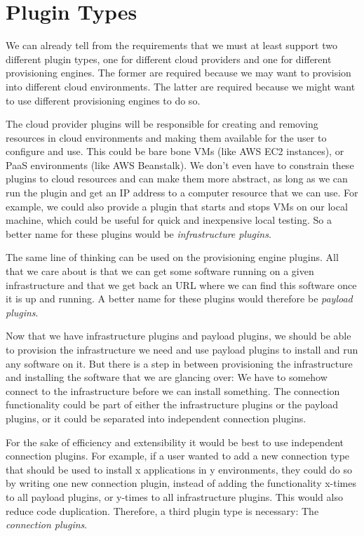 \section{Plugin Types}
\label{design:plugins}

We can already tell from the requirements that we must at least support two different plugin types, one for different cloud providers and one for different provisioning engines.
The former are required because we may want to provision into different cloud environments.
The latter are required because we might want to use different provisioning engines to do so.

The cloud provider plugins will be responsible for creating and removing resources in cloud environments and making them available for the user to configure and use.
This could be bare bone VMs (like AWS EC2 instances), or PaaS environments (like AWS Beanstalk).
We don't even have to constrain these plugins to cloud resources and can make them more abstract, as long as we can run the plugin and get an IP address to a computer resource that we can use.
For example, we could also provide a plugin that starts and stops VMs on our local machine, which could be useful for quick and inexpensive local testing.
So a better name for these plugins would be \textit{infrastructure plugins}.

The same line of thinking can be used on the provisioning engine plugins.
All that we care about is that we can get some software running on a given infrastructure and that we get back an URL where we can find this software once it is up and running.
A better name for these plugins would therefore be \textit{payload plugins}.

Now that we have infrastructure plugins and payload plugins, we should be able to provision the infrastructure we need and use payload plugins to install and run any software on it.
But there is a step in between provisioning the infrastructure and installing the software that we are glancing over: We have to somehow connect to the infrastructure before we can install something.
The connection functionality could be part of either the infrastructure plugins or the payload plugins, or it could be separated into independent connection plugins.

For the sake of efficiency and extensibility it would be best to use independent connection plugins.
For example, if a user wanted to add a new connection type that should be used to install x applications in y environments, they could do so by writing one new connection plugin, instead of adding the functionality x-times to all payload plugins, or y-times to all infrastructure plugins.
This would also reduce code duplication.
Therefore, a third plugin type is necessary: The \textit{connection plugins}.


